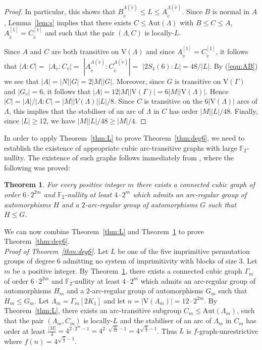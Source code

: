 \documentclass{amsart}
\newtheorem{theorem}{Theorem}
\theoremstyle{definition}
\begin{document}
\begin{proof}
In particular, this shows that $B^{\Lambda({{\tilde{v}}})}_{{\tilde{v}}} \le L \le A^{\Lambda({{\tilde{v}}})}_{{\tilde{v}}}$. Since $B$ is normal in $A$, Lemma~\ref{lem:s} implies that there exists
$C\le {\mathrm{Aut}}(\Lambda)$ with $B\le C\le A$, $A_{{\tilde{v}}}^{[1]} = C_{{\tilde{v}}}^{[1]}$ and such that the pair $(\Lambda,C)$ is locally-$L$. 

Since $A$ and $C$ are both transitive on ${\mathrm V}(\Lambda)$ and since $A_{{\tilde{v}}}^{[1]} = C_{{\tilde{v}}}^{[1]}$, it follows that 
$|A:C| =$  $|A_v:C_v| =$ $|A^{\Lambda({{\tilde{v}}})}_{{\tilde{v}}} : C^{\Lambda({{\tilde{v}}})}_{{\tilde{v}}}|=$ $|2S_4(6):L|=48/|L|$. By (\ref{eqn:AB}) we see that $|A| = |N| |G| = 2|M||G|$. Moreover, since $G$ is transitive on ${\mathrm V}(\Gamma)$ and $|G_v|=6$, it follows that $|A| = 12|M||{\mathrm V}(\Gamma)|=6|M||{\mathrm V}(\Lambda)|$. Hence $|C| = |A| /  |A:C|= |M||V(\Lambda)||L|/8$. Since $C$ is transitive on the $6|{\mathrm V}(\Lambda)|$ arcs of $\Lambda$, this implies
that the stabiliser of an arc of $\Lambda$ in $C$ has order $|M||L|/48$. Finally, since $|L|\geq 12$, we have $|M||L|/48\geq |M|/4$.
\end{proof}

In order to apply Theorem~\ref{thm:L} to prove Theorem~\ref{thm:deg6}, we need to establish the existence of
appropriate cubic arc-transitive graphs with large ${{\mathbb F}}_2$-nullity. The existence of such graphs follows immediately from \cite[Construction 8, Proposition 9]{null}, where the following was proved:

\begin{theorem}
\label{lem:null}
For every positive integer $m$ there exists a connected cubic graph of order $6\cdot2^{2m}$ and ${{\mathbb F}}_2$-nullity at least $4\cdot2^{m}$
which admits an arc-regular group of automorphisms $H$ and a $2$-arc-regular group of automorphisms $G$ such that $H\le G$.
\end{theorem}

We can now combine Theorem~\ref{thm:L} and Theorem~\ref{lem:null} to prove Theorem~\ref{thm:deg6}.\\

\noindent\emph{Proof of Theorem~\ref{thm:deg6}.} Let $L$ be one of the five imprimitive permutation groups of degree $6$ admitting no system of imprimitivity with blocks of size $3$. Let $m$ be a positive integer. By Theorem~\ref{lem:null}, there exists a connected cubic graph $\Gamma_m$ of order $6\cdot2^{2m}$ and ${{\mathbb F}}_2$-nullity at least $4\cdot 2^{m}$ which admits an arc-regular group of automorphisms $H_m$ and a $2$-arc-regular group of automorphisms $G_m$ such that $H_m\le G_m$. Let $\Lambda_m=\Gamma_m[2K_1]$ and let $n=|{\mathrm V}(\Lambda_m)|=12\cdot2^{2m}$. By Theorem~\ref{thm:L}, there exists an arc-transitive subgroup $C_m\le {\mathrm{Aut}}(\Lambda_m)$, such that the pair $(\Lambda_m,C_m)$ is locally-$L$ and the stabiliser of an arc of $\Lambda_m$ in $C_m$ has order at least $\frac{|M|}{4}=4^{2\cdot 2^{m}-1}=4^{2\cdot \sqrt{\frac{n}{12}}-1}=4^{\sqrt{\frac{n}{3}}-1}$. Thus $L$ is $f$-graph-unrestrictive where $f(n)=4^{\sqrt{\frac{n}{3}}-1}$. \hfill \qedsymbol
\end{document}
